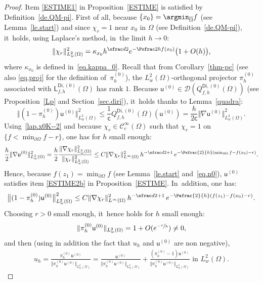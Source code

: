 \begin{proof} Item \eqref{ESTIME1} in Proposition~\ref{ESTIME} is satisfied by Definition~\ref{de.QM-pi}.
First of all, because $\{x_0\}= \argmin_{\overline \Omega} f$ (see Lemma~\ref{le.start}) and since $\chi_r=1$ near $x_0$ in $\Omega$ (see Definition~\ref{de.QM-pi}), it~holds, using Laplace's method, in~the limit $h\to 0$:
\begin{equation}\label{lap.x0K--2}
\Vert \chi_r\Vert_{L^2_w(\Omega)}^2= \kappa_{x_0} h^{\sfrac d2} e^{-\Psfrac 2h f(x_0)} \bigl(1+O(h)\bigr),
\end{equation}
where $\kappa_{x_0}$ is defined in~\eqref{eq.kappa_0}.
Recall that from Corollary~\ref{thm-pc} (see also \eqref{eq.proj} for the definition of~$ \pi_h^{(0)}$), the $L^2_w(\Omega)$-orthogonal projector $ \pi_h^{(0)}$ associated with $\mathsf L_{f,h}^{\mathsf{Di},(0)}(\Omega)$ has rank $1$.
Because $\mathsf u^{(0)}\in \mathcal D(Q_{f,h}^{\mathsf{Di},(0)}(\Omega))$ (see Proposition~\ref{Lp} and Section~\ref{sec.diri}), it~holds thanks to Lemma~\ref{quadra}:
\[
\big \Vert(1- \pi_h^{(0)}) \mathsf u^{(0)} \big \Vert_{L^2_w(\Omega)}^2 \le\frac{1}{\mathsf c}Q_{f,h}^{\mathsf{Di},(0)}(\Omega)(\mathsf u^{(0)})= \frac {h}{2\mathsf c} \Vert \nabla \mathsf u^{(0)} \Vert_{L^2_w(\Omega)}^2.
\]
Using~\eqref{lap.x0K--2} and because $\chi_r\in \mathcal C^\infty_c(\Omega)$ such that $\chi_r=1$ on $\{f<\min_{\partial \Omega}f-r\}$, one has for $h$ small enough:
\[
\frac h2 \Vert \nabla \mathsf u^{(0)} \Vert_{L^2_w(\Omega)}^2 = \frac h2\frac{\Vert \nabla \chi_r\Vert_{L^2_w(\Omega)}^2}{\Vert \chi_r\Vert_{L^2_w(\Omega)}^2}
\le C \Vert \nabla \chi_r \Vert_{L^\infty(\Omega)}^2 \, h^{-\sfrac d2+ 1}\, e^{-\Psfrac{2}{h} (\min_{\partial \Omega}f -f(x_0)-r)}.
\]
Hence, because $f(z_1)=\min_{\partial \Omega}f$ (see Lemma~\ref{le.start} and~\eqref{eq.n0}), $\mathsf u^{(0)}$ satisfies item \eqref{ESTIME2b} in Proposition~\ref{ESTIME}. In~addition, one has:
\[
\big \Vert(1- \pi_h^{(0)}) \mathsf u^{(0)} \big \Vert_{L^2_w(\Omega)}^2 \le C \Vert \nabla \chi_r \Vert_{L^\infty(\Omega)}^2 \, h^{-\sfrac d2+ 1}\, e^{-\Psfrac{2}{h} (f(z_1) -f(x_0)-r)}.
\]
Choosing $r>0$ small enough, it~hence holds for $h$ small enough:\vspace*{-3pt}
\[
\Vert \pi_h^{(0)}\mathsf u^{(0)} \Vert_{L^2_w(\Omega)}=1+O(e^{-\sfrac ch}) \neq 0,
\]
and then (using in addition the fact that $u_h$ and $\mathsf
u^{(0)}$ are non negative),\vspace*{-3pt}
\begin{align*}
u_{h}=\frac{\pi_h^{(0)}\mathsf u^{(0)} }{ \Vert \pi_h^{(0)}\mathsf u^{(0)} \Vert_{L^2_w(\Omega)} }= \frac{\mathsf u^{(0)}}{ \Vert \pi_h^{(0)}\mathsf u^{(0)} \Vert_{L^2_w(\Omega)}} + \frac{(\pi_h^{(0)} -1)\mathsf u^{(0)} }{ \Vert \pi_h^{(0)}\mathsf u^{(0)} \Vert_{L^2_w(\Omega)}} \text{ in } L^2_w(\Omega).

\end{align*}
\end{proof}
